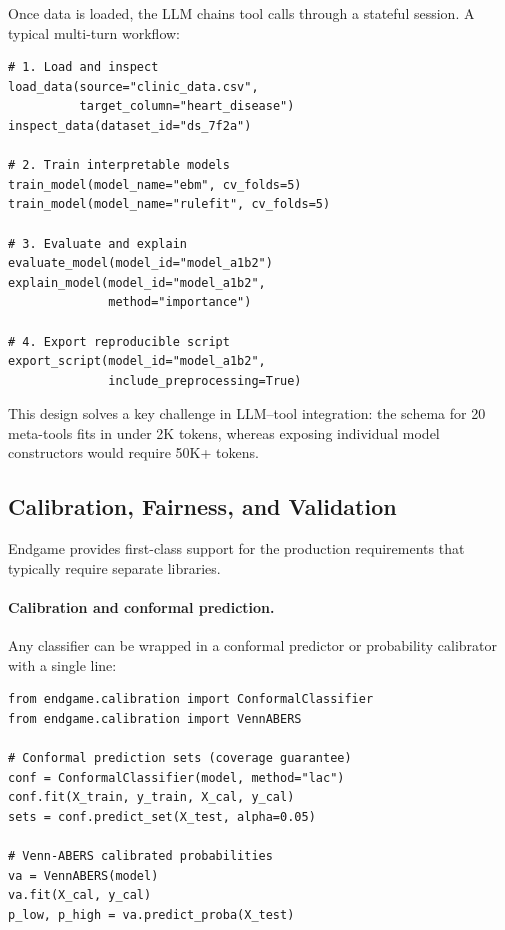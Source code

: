 \documentclass[11pt]{article}
\begin{document}
\noindent Once data is loaded, the LLM chains tool calls through a
stateful session. A typical multi-turn workflow:

\begin{lstlisting}[numbers=none]
# 1. Load and inspect
load_data(source="clinic_data.csv",
          target_column="heart_disease")
inspect_data(dataset_id="ds_7f2a")

# 2. Train interpretable models
train_model(model_name="ebm", cv_folds=5)
train_model(model_name="rulefit", cv_folds=5)

# 3. Evaluate and explain
evaluate_model(model_id="model_a1b2")
explain_model(model_id="model_a1b2",
              method="importance")

# 4. Export reproducible script
export_script(model_id="model_a1b2",
              include_preprocessing=True)
\end{lstlisting}

\noindent This design solves a key challenge in LLM--tool integration: the
schema for 20 meta-tools fits in under 2K tokens, whereas exposing
individual model constructors would require 50K+ tokens.

\subsection{Calibration, Fairness, and Validation}
\label{sec:eval:calibration}

Endgame provides first-class support for the production requirements that
typically require separate libraries.

\paragraph{Calibration and conformal prediction.} Any classifier can be
wrapped in a conformal predictor or probability calibrator with a single
line:

\begin{lstlisting}[numbers=none]
from endgame.calibration import ConformalClassifier
from endgame.calibration import VennABERS

# Conformal prediction sets (coverage guarantee)
conf = ConformalClassifier(model, method="lac")
conf.fit(X_train, y_train, X_cal, y_cal)
sets = conf.predict_set(X_test, alpha=0.05)

# Venn-ABERS calibrated probabilities
va = VennABERS(model)
va.fit(X_cal, y_cal)
p_low, p_high = va.predict_proba(X_test)
\end{lstlisting}
\end{document}
